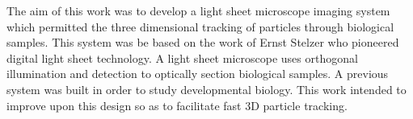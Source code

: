 

The aim of this work was to develop a light sheet microscope imaging system which permitted the three dimensional tracking of particles through biological samples.
This system was be based on the work of Ernst Stelzer who pioneered digital light sheet technology\cite{Huisken2004}.
A light sheet microscope uses orthogonal illumination and detection to optically section biological samples.
A previous system was built in order to study developmental biology.
This work intended to improve upon this design so as to facilitate fast 3D particle tracking.


